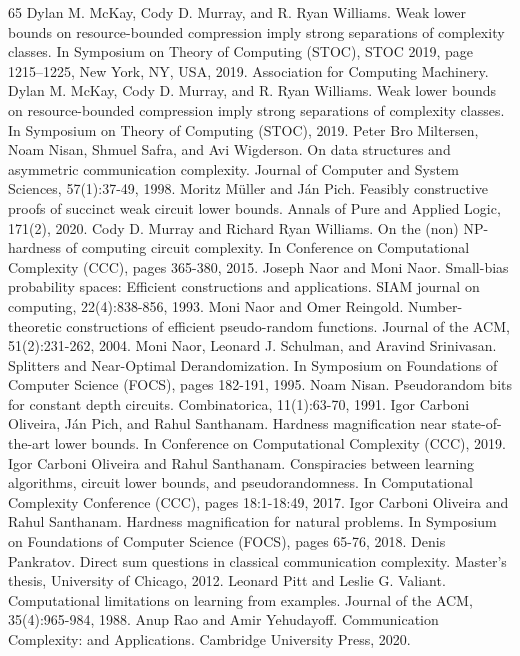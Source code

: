 \begin{thebibliography}{65}
 Dylan M. McKay, Cody D. Murray, and R. Ryan Williams. Weak lower bounds on resource-bounded compression imply strong separations of complexity classes. In Symposium on Theory of Computing (STOC), STOC 2019, page 1215–1225, New York, NY, USA, 2019. Association for Computing Machinery.
 Dylan M. McKay, Cody D. Murray, and R. Ryan Williams. Weak lower bounds on resource-bounded compression imply strong separations of complexity classes. In Symposium on Theory of Computing (STOC), 2019.
 Peter Bro Miltersen, Noam Nisan, Shmuel Safra, and Avi Wigderson. On data structures and asymmetric communication complexity. Journal of Computer and System Sciences, 57(1):37-49, 1998.
 Moritz Müller and Ján Pich. Feasibly constructive proofs of succinct weak circuit lower bounds. Annals of Pure and Applied Logic, 171(2), 2020.
 Cody D. Murray and Richard Ryan Williams. On the (non) NP-hardness of computing circuit complexity. In Conference on Computational Complexity (CCC), pages 365-380, 2015.
 Joseph Naor and Moni Naor. Small-bias probability spaces: Efficient constructions and applications. SIAM journal on computing, 22(4):838-856, 1993.
 Moni Naor and Omer Reingold. Number-theoretic constructions of efficient pseudo-random functions. Journal of the ACM, 51(2):231-262, 2004.
 Moni Naor, Leonard J. Schulman, and Aravind Srinivasan. Splitters and Near-Optimal Derandomization. In Symposium on Foundations of Computer Science (FOCS), pages 182-191, 1995.
 Noam Nisan. Pseudorandom bits for constant depth circuits. Combinatorica, 11(1):63-70, 1991.
 Igor Carboni Oliveira, Ján Pich, and Rahul Santhanam. Hardness magnification near state-of-the-art lower bounds. In Conference on Computational Complexity (CCC), 2019.
 Igor Carboni Oliveira and Rahul Santhanam. Conspiracies between learning algorithms, circuit lower bounds, and pseudorandomness. In Computational Complexity Conference (CCC), pages 18:1-18:49, 2017.
 Igor Carboni Oliveira and Rahul Santhanam. Hardness magnification for natural problems. In Symposium on Foundations of Computer Science (FOCS), pages 65-76, 2018.
 Denis Pankratov. Direct sum questions in classical communication complexity. Master’s thesis, University of Chicago, 2012.
 Leonard Pitt and Leslie G. Valiant. Computational limitations on learning from examples. Journal of the ACM, 35(4):965-984, 1988.
 Anup Rao and Amir Yehudayoff. Communication Complexity: and Applications. Cambridge University Press, 2020.

\end{thebibliography}
